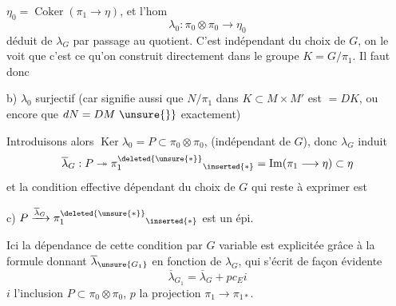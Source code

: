 $\eta_0=\operatorname{Coker}(\pi_1\longrightarrow\eta)$, et l'hom
\[
\lambda_0:\pi_0\otimes\pi_0\longrightarrow\eta_0
\]
déduit de $\lambda_G$ par passage au quotient. C'est
indépendant du choix de $G$, on le voit que
c'est ce qu'on construit directement dans
le groupe $K=G/\pi_1$. Il faut donc

b) $\lambda_0$ surjectif (car signifie aussi
que $N/\pi_1$ dans $K\subset M\times M'$ est $=DK$,
ou encore que $dN=DM\ \unsure{\}}$ exactement)

 Introduisons alors $\operatorname{Ker}\lambda_0=P\subset\pi_0\otimes\pi_0$,
(indépendant de $G$), donc $\lambda_G$ induit
\[
\overline\lambda_G:P\twoheadrightarrow\pi_1^{\deleted{\unsure{*}}}{}_{\inserted{*}}=\operatorname{Im}(\pi_1\longrightarrow\eta)\subset\eta
\]
et la condition effective dépendant du
choix de $G$ qui reste à exprimer
est

c) $P\xrightarrow{\overline\lambda_G}\pi_1^{\deleted{\unsure{*}}}{}_{\inserted{*}}$ est un épi.

Ici la dépendance de cette condition
par $G$ variable est explicitée grâce à
la formule donnant $\overline\lambda_{\unsure{G_1}}$ en fonction
de $\lambda_G$, qui s'écrit de façon évidente
\[
\overline\lambda_{G_1}=\overline\lambda_G+pc_Ei
\]
$i$ l'inclusion $P\subset\pi_0\otimes\pi_0$, $p$ la projection $\pi_1\longrightarrow\pi_{1*}$.
